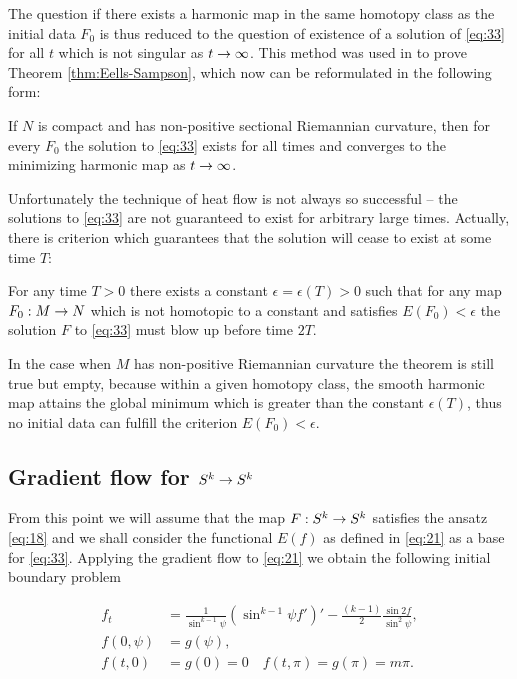 The question if there exists a harmonic map in the same homotopy class
as the initial data $F_0$ is thus reduced to the question of existence
of a solution of \eqref{eq:33} for all $t$ which is not singular as
$t\rightarrow\infty$. This method was used in \cite{Eells1964} to prove
Theorem \ref{thm:Eells-Sampson}, which now can be reformulated in the
following form:

\begin{theorem}\label{thm:Eells-Sampson2}
  If $N$ is compact and has non-positive sectional Riemannian
  curvature, then for every $F_0$ the solution to \eqref{eq:33} exists
  for all times and converges to the minimizing harmonic map as
  $t\rightarrow\infty$.
\end{theorem}

Unfortunately the technique of heat flow is not always so successful
-- the solutions to \eqref{eq:33} are not guaranteed to exist for
arbitrary large times. Actually, there is criterion which guarantees
that the solution will cease to exist at some time $T$:

\begin{theorem}\label{thm:Struwe}
  For any time $T>0$ there exists a constant $\epsilon=\epsilon(T)>0$
  such that for any map $F_0:M\rightarrow N$ which is not homotopic to a
  constant and satisfies $E(F_0)<\epsilon$ the solution $F$ to
  \eqref{eq:33} must blow up before time $2T$.
\end{theorem}

In the case when $M$ has non-positive Riemannian curvature the theorem
is still true but empty, because within a given homotopy class, the
smooth harmonic map attains the global minimum which is greater than
the constant $\epsilon(T)$, thus no initial data can fulfill the
criterion $E(F_0)<\epsilon$.

\subsection{Gradient flow for $S^k\rightarrow S^k$}
\label{sec:gradient-flow-skra}

From this point we will assume that the map $F:S^k\rightarrow S^k$ satisfies
the ansatz \eqref{eq:18} and we shall consider the functional $E(f)$
as defined in \eqref{eq:21} as a base for \eqref{eq:33}. Applying the
gradient flow to \eqref{eq:21} we obtain the following initial
boundary problem

\begin{equation}
  \label{eq:en_flow}
  \begin{split}
    f_t&=\frac{1}{\sin^{k-1}\psi}\left(\sin^{k-1}\psi
      f'\right)'-\frac{(k-1)}{2}\frac{\sin2f}{\sin^2\psi},\\
    f(0,\psi)&=g(\psi),\\
    f(t,0)&=g(0)=0\quad f(t,\pi)=g(\pi)=m\pi.
  \end{split}
\end{equation}

